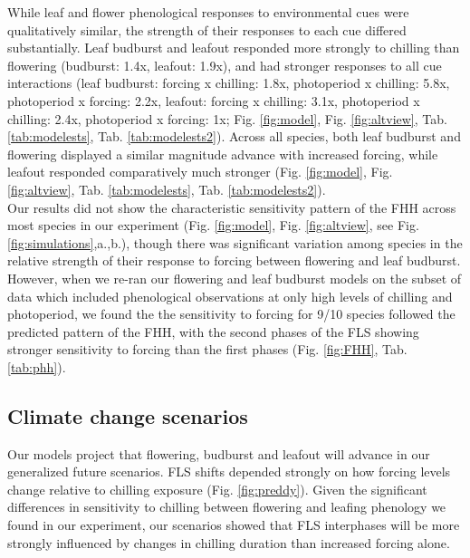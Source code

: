 \documentclass[12pt]{article}\usepackage[]{graphicx}\usepackage[]{color}
\begin{document}
\noindent While leaf and flower phenological responses to environmental cues were qualitatively similar, the strength of their responses to each cue differed substantially. Leaf budburst and leafout responded more strongly to chilling than flowering (budburst: 1.4x, leafout: 1.9x), and had stronger responses to all cue interactions (leaf budburst: forcing x chilling: 1.8x, photoperiod x chilling: 5.8x, photoperiod x forcing: 2.2x, leafout: forcing x chilling: 3.1x, photoperiod x chilling: 2.4x, photoperiod x forcing: 1x; Fig. \ref{fig:model}, Fig. \ref{fig:altview}, Tab. \ref{tab:modelests}, Tab. \ref{tab:modelests2}). Across all species, both leaf budburst and flowering displayed a similar magnitude advance with increased forcing, while leafout responded comparatively much stronger (Fig. \ref{fig:model}, Fig. \ref{fig:altview}, Tab. \ref{tab:modelests}, Tab. \ref{tab:modelests2}).\\

\noindent  Our results did not show the characteristic sensitivity pattern of the FHH across most species in our experiment (Fig. \ref{fig:model}, Fig. \ref{fig:altview}, see Fig. \ref{fig:simulations},a.,b.), though there was significant variation among species in the relative strength of their response to forcing between flowering and leaf budburst. However, when we re-ran our flowering and leaf budburst models on the subset of data which included phenological observations at only high levels of chilling and photoperiod, we found the the sensitivity to forcing for 9/10 species followed the predicted pattern of the FHH, with the second phases of the FLS showing stronger sensitivity to forcing than the first phases (Fig. \ref{fig:FHH}, Tab. \ref{tab:phh}).\\ 


\subsection*{Climate change scenarios}
\noindent Our models project that flowering, budburst and leafout will advance in our generalized future scenarios. FLS shifts depended strongly on how forcing levels change relative to chilling exposure (Fig. \ref{fig:preddy}). Given the significant differences in sensitivity to chilling between flowering and leafing phenology we found in our experiment, our scenarios showed that FLS interphases will be more strongly influenced by changes in chilling duration than increased forcing alone.\\ 
\end{document}
